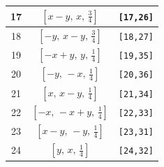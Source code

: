 \documentclass[fleqn,8pt]{jsarticle}
\begin{document}
\begin{longtable}{ccc}
17 & $\left[ x - y,\, x,\, \frac{3}{4} \right]$ & {\tt [17,26]} \\ \hline
18 & $\left[ - y,\, x - y,\, \frac{3}{4} \right]$ & {\tt [18,27]} \\ \hline
19 & $\left[ - x + y,\, y,\, \frac{1}{4} \right]$ & {\tt [19,35]} \\ \hline
20 & $\left[ - y,\, - x,\, \frac{1}{4} \right]$ & {\tt [20,36]} \\ \hline
21 & $\left[ x,\, x - y,\, \frac{1}{4} \right]$ & {\tt [21,34]} \\ \hline
22 & $\left[ - x,\, - x + y,\, \frac{1}{4} \right]$ & {\tt [22,33]} \\ \hline
23 & $\left[ x - y,\, - y,\, \frac{1}{4} \right]$ & {\tt [23,31]} \\ \hline
24 & $\left[ y,\, x,\, \frac{1}{4} \right]$ & {\tt [24,32]} \\
\end{longtable}
\renewcommand{\arraystretch}{1.2}
\end{document}
